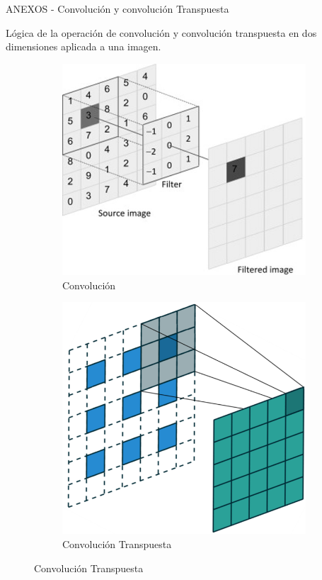 \documentclass[12pt,aspectratio=169]{beamer}
\begin{document}
\begin{frame}{ANEXOS -  Convolución y convolución Transpuesta}

    Lógica de la operación de convolución y convolución transpuesta en dos dimensiones aplicada a una imagen.

    \begin{figure}[h]
        \begin{subfigure}{0.45\textwidth}
            \centering
            \includegraphics[scale=0.325]{figs/conv_2d.jpg}  
            \caption{Convolución}
        \end{subfigure}
        \begin{subfigure}{0.45\textwidth}
            \centering
            \includegraphics[scale=0.30]{figs/trans_conv.PNG}  
            \caption{Convolución Transpuesta}
        \end{subfigure}
    \end{figure}

\end{frame}
\end{document}
